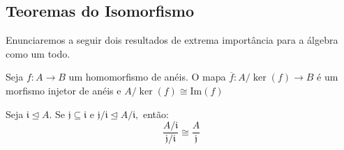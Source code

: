 \documentclass[algebraII_notes.tex]{subfiles}
\begin{document}
\subsection{Teoremas do Isomorfismo}
Enunciaremos a seguir dois resultados de extrema importância para a álgebra como um todo.
\hypertarget{first_isomorphism}{
	\begin{theorem*}
		Seja \(f:A\rightarrow B\) um homomorfismo de anéis. O mapa \(\overline{f}:A/\ker{(f)}\rightarrow B\)
		é um morfismo injetor de anéis e \(A/\ker{(f)}\cong{\mathrm{Im}(f)}\)
	\end{theorem*}}
\hypertarget{second_isomorphism}{
	\begin{theorem*}
		Seja \(\mathfrak{i}\trianglelefteq{A}.\) Se \(\mathfrak{j}\subseteq \mathfrak{i}\) e \(\mathfrak{j}/\mathfrak{i}\trianglelefteq{A/\mathfrak{i}},\) então:
		\[
			\frac{A/\mathfrak{i}}{\mathfrak{j}/\mathfrak{i}}\cong{\frac{A}{\mathfrak{j}}}
		\]
	\end{theorem*}}
\end{document}

